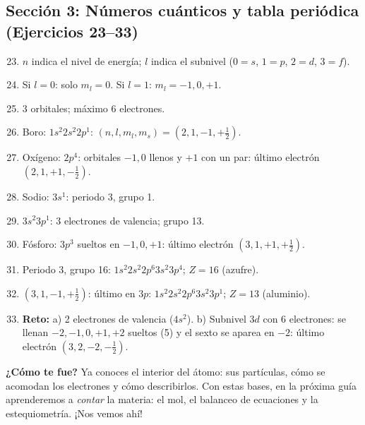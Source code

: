 \documentclass[12pt, letterpaper]{article}
\begin{document}
  \subsection*{Sección 3: Números cuánticos y tabla periódica (Ejercicios 23--33)}

  \begin{enumerate}[leftmargin=*, label=\textbf{\arabic*.}]
    \setcounter{enumi}{22}
    \item $n$ indica el nivel de energía; $l$ indica el subnivel ($0=s$, $1=p$, $2=d$, $3=f$).
    \item Si $l = 0$: solo $m_l = 0$. Si $l = 1$: $m_l = -1, 0, +1$.
    \item 3 orbitales; máximo 6 electrones.
    \item Boro: $1s^{2}2s^{2}2p^{1}$: $(n,l,m_l,m_s) = (2, 1, -1, +\tfrac{1}{2})$.
    \item Oxígeno: $2p^{4}$: orbitales $-1, 0$ llenos y $+1$ con un par: último electrón $(2, 1, +1, -\tfrac{1}{2})$.
    \item Sodio: $3s^{1}$: periodo 3, grupo 1.
    \item $3s^{2}3p^{1}$: 3 electrones de valencia; grupo 13.
    \item Fósforo: $3p^{3}$ sueltos en $-1, 0, +1$: último electrón $(3, 1, +1, +\tfrac{1}{2})$.
    \item Periodo 3, grupo 16: $1s^{2}2s^{2}2p^{6}3s^{2}3p^{4}$; $Z = 16$ (azufre).
    \item $(3, 1, -1, +\tfrac{1}{2})$: último en $3p$: $1s^{2}2s^{2}2p^{6}3s^{2}3p^{1}$; $Z = 13$ (aluminio).
    \item \textbf{Reto:} a) 2 electrones de valencia ($4s^{2}$). b) Subnivel $3d$ con 6 electrones: se llenan $-2, -1, 0, +1, +2$ sueltos (5) y el sexto se aparea en $-2$: último electrón $(3, 2, -2, -\tfrac{1}{2})$.
  \end{enumerate}

  \vspace{8pt}
  \begin{cuadroinfo}
    \small
    \textbf{¿Cómo te fue?} Ya conoces el interior del átomo: sus partículas, cómo se acomodan los electrones y cómo describirlos. Con estas bases, en la próxima guía aprenderemos a \emph{contar} la materia: el mol, el balanceo de ecuaciones y la estequiometría. ¡Nos vemos ahí!
  \end{cuadroinfo}

\fi
\end{document}
